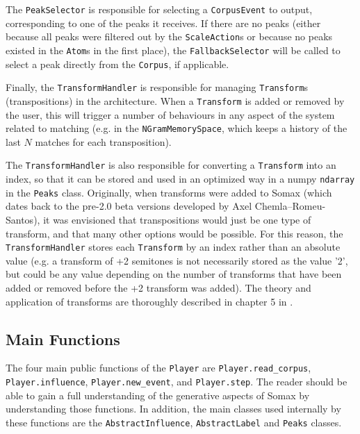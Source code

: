 The \texttt{PeakSelector} is responsible for selecting a \texttt{CorpusEvent} to output, corresponding to one of the peaks it receives. If there are no peaks (either because all peaks were filtered out by the \texttt{ScaleAction}s or because no peaks existed in the \texttt{Atom}s in the first place), the \texttt{FallbackSelector} will be called to select a peak directly from the \texttt{Corpus}, if applicable.

Finally, the \texttt{TransformHandler} is responsible for managing \texttt{Transform}s (transpositions) in the architecture. When a \texttt{Transform} is added or removed by the user, this will trigger a number of behaviours in any aspect of the system related to matching (e.g. in the \texttt{NGramMemorySpace}, which keeps a history of the last $N$ matches for each transposition).

The \texttt{TransformHandler} is also responsible for converting a \texttt{Transform} into an index, so that it can be stored and used in an optimized way in a numpy \texttt{ndarray} in the \texttt{Peaks} class. Originally, when transforms were added to Somax (which dates back to the pre-2.0 beta versions developed by Axel Chemla--Romeu-Santos), it was envisioned that transpositions would just be one type of transform, and that many other options would be possible. For this reason, the \texttt{TransformHandler} stores each \texttt{Transform} by an index rather than an absolute value (e.g. a transform of +2 semitones is not necessarily stored as the value '2', but could be any value depending on the number of transforms that have been added or removed before the +2 transform was added). The theory and application of transforms are thoroughly described in chapter 5 in \cite{somaxtheory2021}.



\subsection{Main Functions}\label{ssec:2-player-functions}

The four main public functions of the \texttt{Player} are \texttt{Player.read\_corpus}, \texttt{Player.influence}, \texttt{Player.new\_event}, and \texttt{Player.step}. The reader should be able to gain a full understanding of the generative aspects of Somax by understanding those functions. In addition, the main classes used internally by these functions are the \texttt{AbstractInfluence}, \texttt{AbstractLabel} and \texttt{Peaks} classes.

